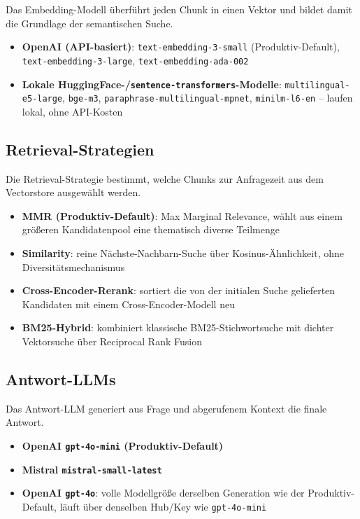 \documentclass[11pt,a4paper]{article}
\begin{document}
Das Embedding-Modell überführt jeden Chunk in einen Vektor und bildet damit die Grundlage der semantischen Suche.

\begin{itemize}
    \item \textbf{OpenAI (API-basiert)}: \texttt{text-embedding-3-small} (Produktiv-Default), \texttt{text-embedding-3-large}, \texttt{text-embedding-ada-002}
    \item \textbf{Lokale HuggingFace-/\texttt{sentence-transformers}-Modelle}: \texttt{multilingual-e5-large}, \texttt{bge-m3}, \texttt{paraphrase-multilingual-mpnet}, \texttt{minilm-l6-en} -- laufen lokal, ohne API-Kosten
\end{itemize}

\subsection{Retrieval-Strategien}

Die Retrieval-Strategie bestimmt, welche Chunks zur Anfragezeit aus dem Vectorstore ausgewählt werden.

\begin{itemize}
    \item \textbf{MMR (Produktiv-Default)}: Max Marginal Relevance, wählt aus einem größeren Kandidatenpool eine thematisch diverse Teilmenge
    \item \textbf{Similarity}: reine Nächste-Nachbarn-Suche über Kosinus-Ähnlichkeit, ohne Diversitätsmechanismus
    \item \textbf{Cross-Encoder-Rerank}: sortiert die von der initialen Suche gelieferten Kandidaten mit einem Cross-Encoder-Modell neu
    \item \textbf{BM25-Hybrid}: kombiniert klassische BM25-Stichwortsuche mit dichter Vektorsuche über Reciprocal Rank Fusion
\end{itemize}

\subsection{Antwort-LLMs}

Das Antwort-LLM generiert aus Frage und abgerufenem Kontext die finale Antwort.

\begin{itemize}
    \item \textbf{OpenAI \texttt{gpt-4o-mini} (Produktiv-Default)}
    \item \textbf{Mistral \texttt{mistral-small-latest}}
    \item \textbf{OpenAI \texttt{gpt-4o}}: volle Modellgröße derselben Generation wie der Produktiv-Default, läuft über denselben Hub/Key wie \texttt{gpt-4o-mini}
\end{itemize}
\end{document}
